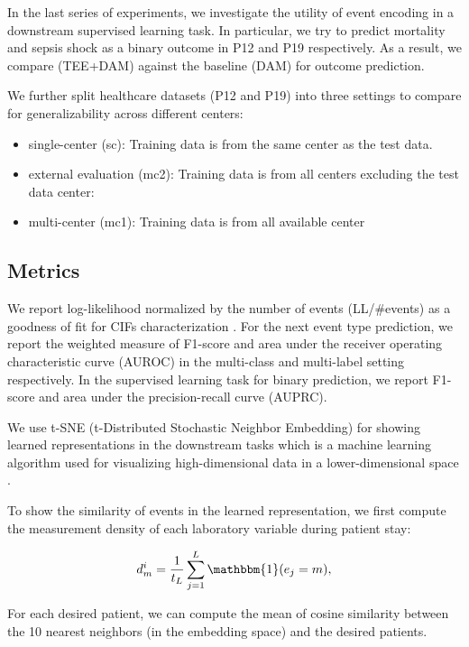 \documentclass[journal,twoside,web]{ieeecolor}
\begin{document}
In the last series of experiments, we investigate the utility of event encoding in a downstream supervised learning task. In particular, we try to predict mortality and sepsis shock as a binary outcome in P12 and P19 respectively. As a result, we compare (TEE+DAM) against the baseline (DAM) for outcome prediction.

We further split healthcare datasets (P12 and P19) into three settings to compare for generalizability across different centers:

\begin{itemize}
    \item single-center (sc): Training data is from the same center as the test data.  
    \item external evaluation (mc2): Training data is from all centers excluding the test data center:
    \item multi-center (mc1): Training data is from all available center
\end{itemize} 




\subsection*{Metrics}
We report log-likelihood normalized by the number of events (LL/\#events) as a goodness of fit for CIFs characterization \cite*{zhangSelfAttentiveHawkesProcess2020,zuoTransformerHawkesProcess2020a}. For the next event type prediction, we report the weighted measure of F1-score and area under the receiver operating characteristic curve (AUROC) in the multi-class and multi-label setting respectively. In the supervised learning task for binary prediction, we report F1-score and area under the precision-recall curve (AUPRC).

We use t-SNE (t-Distributed Stochastic Neighbor Embedding) for showing learned representations in the downstream tasks which is a machine learning algorithm used for visualizing high-dimensional data in a lower-dimensional space \cite*{maatenVisualizingDataUsing2008}.

To show the similarity of events in the learned representation, we first compute the measurement density of each laboratory variable during patient stay:

\begin{equation}
    d_{m}^{i}=  \frac{1}{t_L} \sum_{j=1}^{L} \mathbbm{1}(e_j=m),
\end{equation}

For each desired patient, we can compute the mean of cosine similarity between the 10 nearest neighbors (in the embedding space) and the desired patients.
\end{document}
